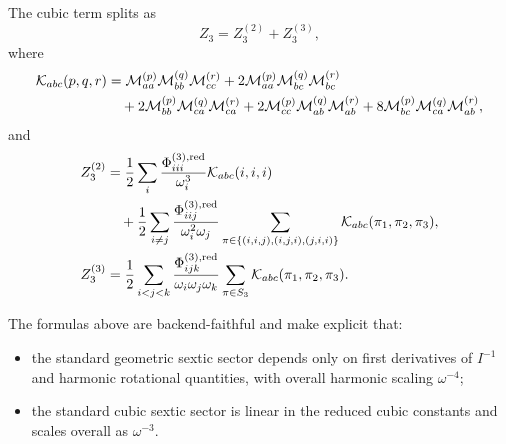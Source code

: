 The cubic term splits as
\begin{equation}
Z_3 = Z_3^{(2)} + Z_3^{(3)},
\end{equation}
where
\begin{align}
\mathcal{K}_{abc}(p,q,r)
&=
\mathcal{M}^{(p)}_{aa}\mathcal{M}^{(q)}_{bb}\mathcal{M}^{(r)}_{cc}
+2\mathcal{M}^{(p)}_{aa}\mathcal{M}^{(q)}_{bc}\mathcal{M}^{(r)}_{bc}
\notag\\
&\quad
+2\mathcal{M}^{(p)}_{bb}\mathcal{M}^{(q)}_{ca}\mathcal{M}^{(r)}_{ca}
+2\mathcal{M}^{(p)}_{cc}\mathcal{M}^{(q)}_{ab}\mathcal{M}^{(r)}_{ab}
+8\mathcal{M}^{(p)}_{bc}\mathcal{M}^{(q)}_{ca}\mathcal{M}^{(r)}_{ab},
\end{align}
and
\begin{align}
Z_3^{(2)}
&=
\frac{1}{2}\sum_i
\frac{\Phi^{(3),\mathrm{red}}_{iii}}{\omega_i^3}
\mathcal{K}_{abc}(i,i,i)
\notag\\
&\quad
+\frac{1}{2}\sum_{i\neq j}
\frac{\Phi^{(3),\mathrm{red}}_{iij}}{\omega_i^2\omega_j}
\sum_{\pi\in\{(i,i,j),(i,j,i),(j,i,i)\}}
\mathcal{K}_{abc}(\pi_1,\pi_2,\pi_3),
\\
Z_3^{(3)}
&=
\frac{1}{2}\sum_{i<j<k}
\frac{\Phi^{(3),\mathrm{red}}_{ijk}}{\omega_i\omega_j\omega_k}
\sum_{\pi\in S_3}
\mathcal{K}_{abc}(\pi_1,\pi_2,\pi_3).
\end{align}

The formulas above are backend-faithful and make explicit that:
\begin{itemize}
\item the standard geometric sextic sector depends only on first derivatives of
$I^{-1}$ and harmonic rotational quantities, with overall harmonic scaling
$\omega^{-4}$;
\item the standard cubic sextic sector is linear in the reduced cubic constants
and scales overall as $\omega^{-3}$.
\end{itemize}
